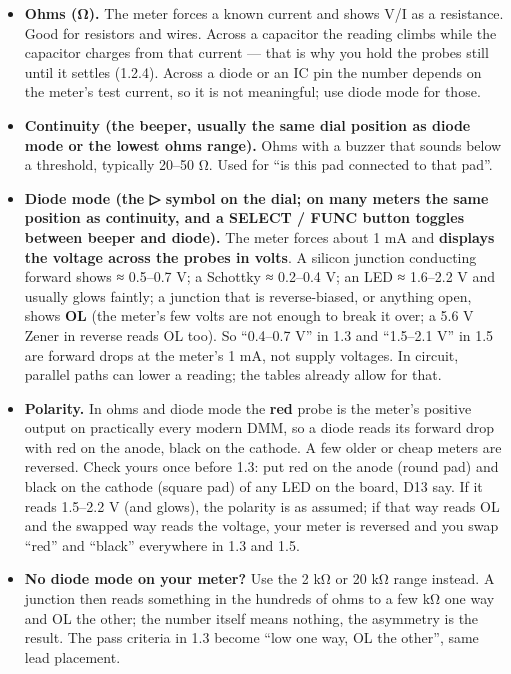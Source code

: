 \documentclass[
  10pt,
  twoside]{article}
\providecommand{\tightlist}{%
  \setlength{\itemsep}{0pt}\setlength{\parskip}{0pt}}
\begin{document}
\begin{itemize}
\tightlist
\item
  \textcolor[HTML]{0040A0}{\textbf{Ohms (Ω).} The meter
  forces a known current and shows V/I as a resistance. Good
  for resistors and wires. Across a capacitor the reading
  climbs while the capacitor charges from that current ---
  that is why you hold the probes still until it settles
  (1.2.4). Across a diode or an IC pin the number depends on
  the meter's test current, so it is not meaningful; use
  diode mode for those.}
\item
  \textcolor[HTML]{0040A0}{\textbf{Continuity (the beeper,
  usually the same dial position as diode mode or the lowest
  ohms range).} Ohms with a buzzer that sounds below a
  threshold, typically 20--50 Ω. Used for ``is this pad
  connected to that pad''.}
\item
  \textcolor[HTML]{0040A0}{\textbf{Diode mode (the
  ▷\textbar{} symbol on the dial; on many meters the same
  position as continuity, and a SELECT / FUNC button toggles
  between beeper and diode).} The meter forces about 1 mA
  and \textbf{displays the voltage across the probes in
  volts}. A silicon junction conducting forward shows ≈
  0.5--0.7 V; a Schottky ≈ 0.2--0.4 V; an LED ≈ 1.6--2.2 V
  and usually glows faintly; a junction that is
  reverse-biased, or anything open, shows \textbf{OL} (the
  meter's few volts are not enough to break it over; a 5.6 V
  Zener in reverse reads OL too). So ``0.4--0.7 V'' in 1.3
  and ``1.5--2.1 V'' in 1.5 are forward drops at the meter's
  1 mA, not supply voltages. In circuit, parallel paths can
  lower a reading; the tables already allow for that.}
\item
  \textcolor[HTML]{0040A0}{\textbf{Polarity.} In ohms and
  diode mode the \textbf{red} probe is the meter's positive
  output on practically every modern DMM, so a diode reads
  its forward drop with red on the anode, black on the
  cathode. A few older or cheap meters are reversed. Check
  yours once before 1.3: put red on the anode (round pad)
  and black on the cathode (square pad) of any LED on the
  board, D13 say. If it reads 1.5--2.2 V (and glows), the
  polarity is as assumed; if that way reads OL and the
  swapped way reads the voltage, your meter is reversed and
  you swap ``red'' and ``black'' everywhere in 1.3 and 1.5.}
\item
  \textcolor[HTML]{0040A0}{\textbf{No diode mode on your
  meter?} Use the 2 kΩ or 20 kΩ range instead. A junction
  then reads something in the hundreds of ohms to a few kΩ
  one way and OL the other; the number itself means nothing,
  the asymmetry is the result. The pass criteria in 1.3
  become ``low one way, OL the other'', same lead
  placement.}
\end{itemize}
\end{document}
